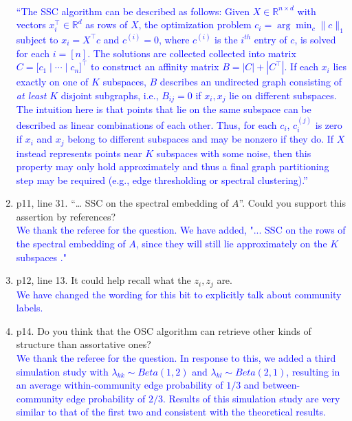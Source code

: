 \documentclass[
]{article}
\begin{document}
\begin{enumerate}
{  }\\
  \textcolor{blue}{
  ``The SSC algorithm can be described as follows: 
  Given \(X \in \mathbb{R}^{n \times d}\) with vectors
  \(x_i^\top \in \mathbb{R}^d\) as rows of \(X\), the optimization problem
  \(c_i = \arg\min_{c} \|c\|_1\) subject to \(x_i = X^\top c\) and
  \(c^{(i)} = 0\), where $c^{(i)}$ is the $i^{th}$ entry of $c$, is solved for each \(i = [n]\). 
  The solutions are collected collected into matrix
  \(C = \bigl[ c_1 \mid \cdots \mid c_n \bigr]^\top\) to
  construct an affinity matrix \(B = |C| + |C^\top|\). If each \(x_i\) lies
  exactly on one of \(K\) subspaces, \(B\) describes an undirected graph
  consisting of {\em at least} \(K\) disjoint subgraphs, i.e., \(B_{ij} = 0\) if \(x_i, x_j\) lie on different subspaces. 
  The intuition here is that points that lie on the same subspace can be described as linear combinations of each other. 
  Thus, for each $c_i$, $c_i^{(j)}$ is zero if $x_i$ and $x_j$ belong to different subspaces and may be nonzero if they do. 
  If \(X\) instead represents points near \(K\) subspaces with some noise, 
  then this property may only hold approximately and thus 
  a final graph partitioning step may be required 
  (e.g., edge thresholding or spectral clustering).''
  }
\item
  p11, line 31. ``\ldots{} SSC on the spectral embedding of \(A\)''.
  Could you support this assertion by references?\\
  \textcolor{blue}{
  We thank the referee for the question. 
  We have added, "... SSC on the rows of the spectral embedding of $A$, since they will still lie approximately on the $K$ subspaces \citep{rubindelanchy2017statistical}."
  }
\item
  p12, line 13. It could help recall what the \(z_i, z_j\) are.\\
  \textcolor{blue}{
  We have changed the wording for this bit to explicitly talk about community labels. 
  }
\item
  p14. Do you think that the OSC algorithm can retrieve other kinds of
  structure than assortative ones?\\
  \textcolor{blue}{
  We thank the referee for the question.
  In response to this, we added a third simulation study with $\lambda_{kk} \sim Beta(1,2)$ and $\lambda_{kl} \sim Beta(2,1)$, resulting in an average within-community edge probability of $1/3$ and between-community edge probability of $2/3$. 
  Results of this simulation study are very similar to that of the first two and consistent with the theoretical results.
}
\end{enumerate}
\end{document}
